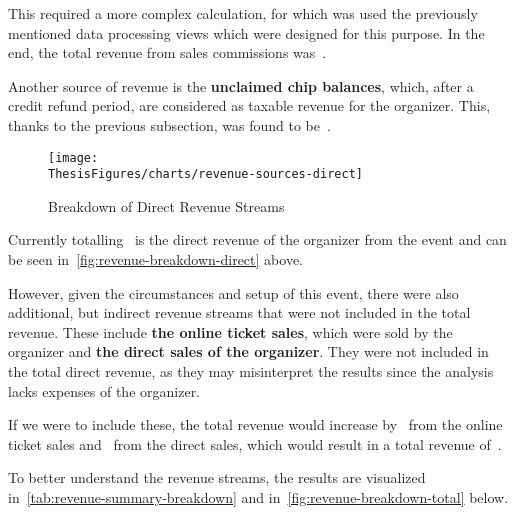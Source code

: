 This required a more complex calculation, for which was used the previously mentioned data processing views which were designed for this purpose.
In the end, the total revenue from sales commissions was~.

Another source of revenue is the \textbf{unclaimed chip balances}, which, after a credit refund period, are considered as taxable revenue for the organizer.
This, thanks to the previous subsection, was found to be~.

\begin{figure}[H]
	\centering
	\texttt{[image: \\ThesisFigures/charts/revenue-sources-direct]}
	\caption{Breakdown of Direct Revenue Streams}
	\label{fig:revenue-breakdown-direct}
	\source
\end{figure}

Currently totalling~ is the direct revenue of the organizer from the event and can be seen in~\autoref{fig:revenue-breakdown-direct} above.

However, given the circumstances and setup of this event, there were also additional, but indirect revenue streams that were not included in the total revenue.
These include \textbf{the online ticket sales}, which were sold by the organizer and \textbf{the direct sales of the organizer}.
They were not included in the total direct revenue, as they may misinterpret the results since the analysis lacks expenses of the organizer.

If we were to include these, the total revenue would increase by~ from the online ticket sales and~ from the direct sales, which would result in a total revenue of~.

To better understand the revenue streams, the results are visualized in~\autoref{tab:revenue-summary-breakdown} and in~\autoref{fig:revenue-breakdown-total} below.

